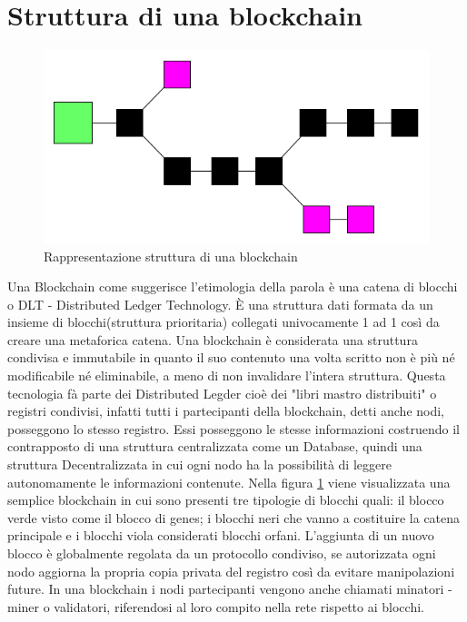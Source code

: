 \documentclass[11pt,a4paper,titlepage]{report}
\begin{document}
\section{Struttura di una blockchain}
\begin{figure}[h]
	\includegraphics[width=\textwidth]{bl1}
	\centering
	\caption{Rappresentazione struttura di una blockchain}
	\label{fig:blockchain1}
\end{figure}

Una Blockchain come suggerisce l'etimologia della parola è una catena di blocchi o DLT - Distributed Ledger Technology. È una struttura dati formata da un insieme di blocchi(struttura prioritaria) collegati univocamente 1 ad 1 così da creare una metaforica catena. Una blockchain è considerata una struttura condivisa e immutabile in quanto il suo contenuto una volta scritto non è più né modificabile né eliminabile, a meno di non invalidare l'intera struttura. Questa tecnologia fà parte dei Distributed Legder cioè dei "libri mastro distribuiti" o registri condivisi, infatti tutti i partecipanti della blockchain, detti anche nodi, posseggono lo stesso registro. Essi posseggono le stesse informazioni costruendo il contrapposto di una struttura centralizzata come un Database, quindi una struttura Decentralizzata in cui ogni nodo ha la possibilità di leggere autonomamente le informazioni contenute.
Nella figura \ref{fig:blockchain1} viene visualizzata una semplice blockchain in cui sono presenti tre tipologie di blocchi quali: il blocco verde visto come il blocco di genes; i blocchi neri che vanno a costituire la catena principale e i blocchi viola considerati blocchi orfani. L'aggiunta di un nuovo blocco è globalmente regolata da un protocollo condiviso, se autorizzata ogni nodo aggiorna la propria copia privata del registro così da evitare manipolazioni future. In una blockchain i nodi partecipanti vengono anche chiamati minatori - miner o validatori, riferendosi al loro compito nella rete rispetto ai blocchi.
\end{document}
